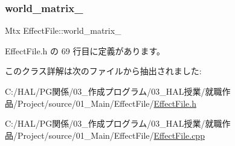 \subsubsection{\texorpdfstring{world\+\_\+matrix\+\_\+}{world\_matrix\_}}
{\footnotesize\ttfamily Mtx Effect\+File\+::world\+\_\+matrix\+\_\+}



 Effect\+File.\+h の 69 行目に定義があります。



このクラス詳解は次のファイルから抽出されました\+:\begin{DoxyCompactItemize}
\item 
C\+:/\+H\+A\+L/\+P\+G関係/03\+\_\+作成プログラム/03\+\_\+\+H\+A\+L授業/就職作品/\+Project/source/01\+\_\+\+Main/\+Effect\+File/\mbox{\hyperlink{_effect_file_8h}{Effect\+File.\+h}}\item 
C\+:/\+H\+A\+L/\+P\+G関係/03\+\_\+作成プログラム/03\+\_\+\+H\+A\+L授業/就職作品/\+Project/source/01\+\_\+\+Main/\+Effect\+File/\mbox{\hyperlink{_effect_file_8cpp}{Effect\+File.\+cpp}}\end{DoxyCompactItemize}
